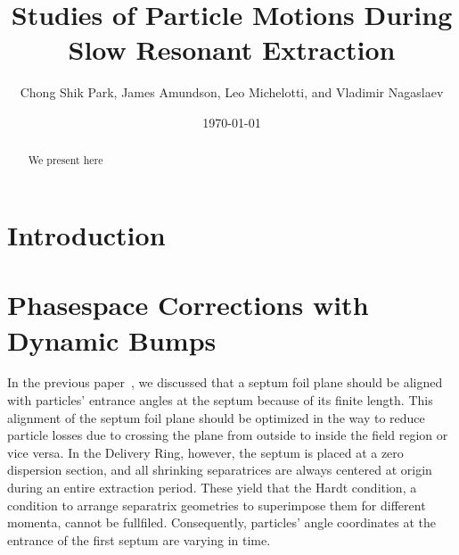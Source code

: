 \documentclass[aps,prstab,onecolumn,preprint,nofootinbib]{revtex4-1}
\begin{document}
\title{Studies of Particle Motions During Slow Resonant Extraction}
\author{Chong Shik Park, James Amundson, Leo Michelotti, and Vladimir Nagaslaev}
\date{\today}

\begin{abstract}
We present here 
\end{abstract}

\pacs{}
\maketitle

\setcounter{tocdepth}{5}


\section{\label{sec:intro}Introduction}

\clearpage
\section{\label{sec:bump}Phasespace Corrections with Dynamic Bumps}

In the previous paper~\cite{mu2e}, we discussed that a septum foil plane should be aligned with particles' entrance angles at the septum because of its finite length.
This alignment of the septum foil plane should be optimized in the way to reduce particle losses due to crossing the plane from outside to inside the field region or vice versa.
In the Delivery Ring, however, the septum is placed at a zero dispersion section, and all shrinking separatrices are always centered at origin during an entire extraction period.
These yield that the Hardt condition, a condition to arrange separatrix geometries to superimpose them for different momenta, cannot be fullfiled.
Consequently, particles' angle coordinates at the entrance of the first septum are varying in time.
\end{document}
